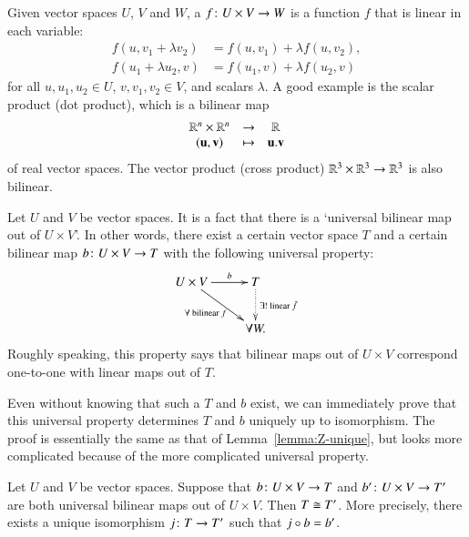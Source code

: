 \begin{iexample} 
\label{eg:univ-tensor}
Given vector%
%
%
spaces $U$, $V$ and $W$, a  $f\from U \times V \to W$ is a function $f$ that is linear in each
variable:
% 
\begin{align*}
f(u, v_1 + \lambda v_2)         &=      
f(u, v_1) + \lambda f(u, v_2),  \\
f(u_1 + \lambda u_2, v)         &=      
f(u_1, v) + \lambda f(u_2, v)   
\end{align*}
% 
for all $u, u_1, u_2 \in U$, $v, v_1, v_2 \in V$, and scalars $\lambda$.  A
good example is the scalar product (dot product), which is a bilinear map
\[
\begin{array}{ccc}
\mathbb{R}^n \times \mathbb{R}^n        &\to            &\mathbb{R}                 \\
(\mathbf{u}, \mathbf{v})        &\mapsto        &\mathbf{u}.\mathbf{v}
\end{array}
\]
of real vector spaces.  The vector product (cross product) $\mathbb{R}^3 \times
\mathbb{R}^3 \to \mathbb{R}^3$ is also bilinear.  

Let $U$ and $V$ be vector spaces.  It is a fact that there is a `universal
bilinear map out of $U \times V$'.  In other words, there exist a certain
vector space $T$%
%
%
and a certain bilinear map $b\from U \times V \to T$ with the following
universal property:
% 
\begin{equation}        
\label{eq:univ-tensor} 
\begin{array}{c}
\xymatrix{
U \times V \ar[r]^-b \ar[dr]_{\forall \text{ bilinear } f} &
T \ar@{.>}[d]^{\exists! \text{ linear } \bar{f}}     \\
&
\forall W.
}
\end{array}
\end{equation}
% 
Roughly speaking, this property says that bilinear maps out of $U \times V$
correspond one-to-one with linear maps out of $T$.

Even without knowing that such a $T$ and $b$ exist, we can immediately
prove that this universal property determines $T$ and $b$ uniquely up to
isomorphism.  The proof is essentially the same as that of
Lemma~\ref{lemma:Z-unique}, but looks more complicated because of the more
complicated universal property.
\end{iexample}

\begin{ilemma}   
\label{lemma:tensor-unique}
%
%
Let $U$ and $V$ be vector spaces.  Suppose that $b\from U \times V \to T$
and $b'\from U \times V \to T'$ are both universal bilinear maps out of $U
\times V$.  Then $T \cong T'$.  More precisely, there exists a unique
isomorphism $j\from T \to T'$ such that $j \mathbin{\circ} b = b'$.
\end{ilemma}

